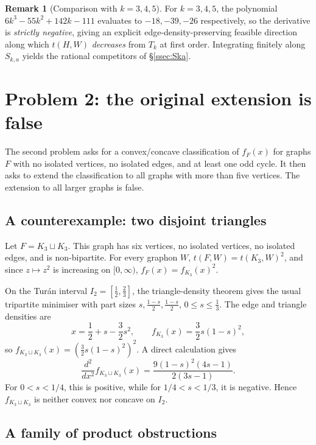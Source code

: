 \documentclass[11pt]{amsart}
\theoremstyle{definition}
\newtheorem{remark}[theorem]{Remark}
\newcommand{\1}{\mathbf 1}
\begin{document}
\begin{remark}[Comparison with $k=3,4,5$]
For $k=3,4,5$, the polynomial $6k^3-55k^2+142k-111$ evaluates to $-18,-39,-26$
respectively, so the derivative is \emph{strictly negative}, giving an explicit
edge-density-preserving feasible direction along which $t(H,W)$ \emph{decreases}
from $T_k$ at first order.  Integrating finitely along $S_{k,a}$ yields the
rational competitors of \S\ref{ssec:Ska}.
\end{remark}

\section{Problem 2: the original extension is false}
\label{sec:problem2false}

The second problem asks for a convex/concave classification of $f_F(x)$ for
graphs $F$ with no isolated vertices, no isolated edges, and at least one odd
cycle.  It then asks to extend the classification to all graphs with more than
five vertices.  The extension to all larger graphs is false.

\subsection{A counterexample: two disjoint triangles}

Let $F=K_3\sqcup K_3$.  This graph has six vertices, no isolated vertices, no
isolated edges, and is non-bipartite.  For every graphon $W$,
$t(F,W)=t(K_3,W)^2$, and since $z\mapsto z^2$ is increasing on $[0,\infty)$,
$f_F(x)=f_{K_3}(x)^2$.

On the Tur\'an interval $I_2=[\tfrac12,\tfrac23]$, the triangle-density theorem
gives the usual tripartite minimiser with part sizes $s,\frac{1-s}{2},
\frac{1-s}{2}$, $0\le s\le \frac13$.  The edge and triangle densities are
\[
   x=\frac12+s-\frac32s^2,
   \qquad
   f_{K_3}(x)=\frac32s(1-s)^2,
\]
so $f_{K_3\sqcup K_3}(x)=\left(\frac32s(1-s)^2\right)^2$.  A direct calculation
gives
\[
   \frac{d^2}{dx^2}f_{K_3\sqcup K_3}(x)
   =\frac{9(1-s)^2(4s-1)}{2(3s-1)}.
\]
For $0<s<1/4$, this is positive, while for $1/4<s<1/3$, it is negative.  Hence
$f_{K_3\sqcup K_3}$ is neither convex nor concave on $I_2$.

\subsection{A family of product obstructions}
\end{document}
